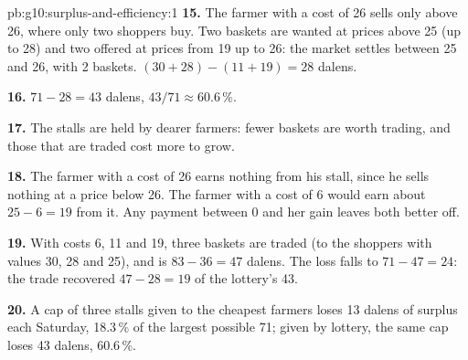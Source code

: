 \begin{solution}{pb:g10:surplus-and-efficiency:1}
\textbf{15.} The farmer with a cost of 26 sells only above 26, where only two shoppers buy. Two baskets are wanted at prices above 25 (up to 28) and two offered at
prices from 19 up to 26: the market settles between 25 and 26, with 2 baskets.  $(30 + 28) - (11 + 19) = 28$ dalens.

\textbf{16.} $71 - 28 = 43$ dalens, $43/71 \approx 60.6\,\%$.

\textbf{17.} The stalls are held by dearer farmers: fewer baskets are worth trading, and those that are traded cost more to grow.

\textbf{18.} The farmer with a cost of 26 earns nothing from his stall, since he sells nothing at a price below 26. The farmer with a cost of 6 would earn about $25
- 6 = 19$ from it. Any payment between 0 and her gain leaves both better off.

\textbf{19.} With costs 6, 11 and 19, three baskets are traded (to the shoppers with values 30, 28 and 25), and  is $83 - 36 = 47$ dalens. The loss falls
to $71 - 47 = 24$: the trade recovered $47 - 28 = 19$ of the lottery's 43.

\textbf{20.} A cap of three stalls given to the cheapest farmers loses 13 dalens of surplus each Saturday, 18.3\,\% of the largest possible 71; given by lottery, the
same cap loses 43 dalens, 60.6\,\%.
\end{solution}
